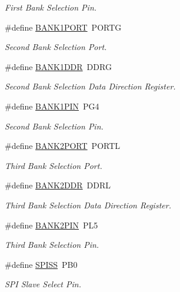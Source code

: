\begin{DoxyCompactItemize}
\begin{DoxyCompactList}\small\item\em First Bank Selection Pin. \end{DoxyCompactList}\item 
\#define \hyperlink{group__config_ga8b3ee7126196f6e939989eae097c3ac4}{B\-A\-N\-K1\-P\-O\-R\-T}~P\-O\-R\-T\-G
\begin{DoxyCompactList}\small\item\em Second Bank Selection Port. \end{DoxyCompactList}\item 
\#define \hyperlink{group__config_gada13cb9312072b48628763a6e1fd50d3}{B\-A\-N\-K1\-D\-D\-R}~D\-D\-R\-G
\begin{DoxyCompactList}\small\item\em Second Bank Selection Data Direction Register. \end{DoxyCompactList}\item 
\#define \hyperlink{group__config_gacfebedc2067e3c52e6ae1f627afcc1e1}{B\-A\-N\-K1\-P\-I\-N}~P\-G4
\begin{DoxyCompactList}\small\item\em Second Bank Selection Pin. \end{DoxyCompactList}\item 
\#define \hyperlink{group__config_gad35afb0251524c201c2d60f3d035af32}{B\-A\-N\-K2\-P\-O\-R\-T}~P\-O\-R\-T\-L
\begin{DoxyCompactList}\small\item\em Third Bank Selection Port. \end{DoxyCompactList}\item 
\#define \hyperlink{group__config_ga62f56230c5f5f7220c44ab1c93d677ab}{B\-A\-N\-K2\-D\-D\-R}~D\-D\-R\-L
\begin{DoxyCompactList}\small\item\em Third Bank Selection Data Direction Register. \end{DoxyCompactList}\item 
\#define \hyperlink{group__config_ga74c95f6ccdb5e482e97a5af53ed74229}{B\-A\-N\-K2\-P\-I\-N}~P\-L5
\begin{DoxyCompactList}\small\item\em Third Bank Selection Pin. \end{DoxyCompactList}\item 
\#define \hyperlink{group__config_gab652052c0495e4b720b52cdcf83f535d}{S\-P\-I\-S\-S}~P\-B0
\begin{DoxyCompactList}\small\item\em S\-P\-I Slave Select Pin. \end{DoxyCompactList}\item 

\end{DoxyCompactItemize}
